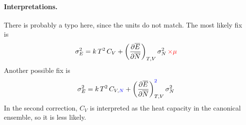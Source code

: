 \documentclass[twocolumn, 10pt]{article}
\numberwithin{equation}{section}
\begin{document}
\paragraph*{Interpretations.}

There is probably a typo here, since the units do not match.
%
The most likely fix is
\begin{equation}
  \sigma_E^2 = k \, T^2 \, C_V
  + \left( \frac{\partial \overline E }
                { \partial \overline N} \right)_{T, V}
    \sigma_N^2 \, \textcolor{red}{\times \mu}
  \label{eq:prob3-22a}
\end{equation}
%
Another possible fix is
%
\begin{equation}
  \sigma_E^2 = k \, T^2 \, C_{V,\textcolor{blue}{N}}
  + \left( \frac{\partial \overline E }
                { \partial \overline N} \right)_{T, V}^{\textcolor{blue}{2}}
    \sigma_N^2
  \label{eq:prob3-22b}
\end{equation}
%
In the second correction,
$C_V$ is interpreted as the heat capacity in the canonical ensemble,
so it is less likely.
\end{document}
